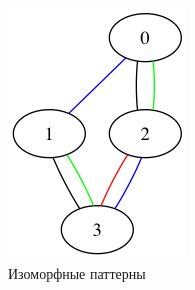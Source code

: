 \begin{figure}[H]
    \includegraphics[max width=\linewidth]{fig/2/patterns/similar2.png}
  \endminipage
  \caption{Изоморфные паттерны}
  \label{fig:isomorphic_patterns}
\end{figure}

